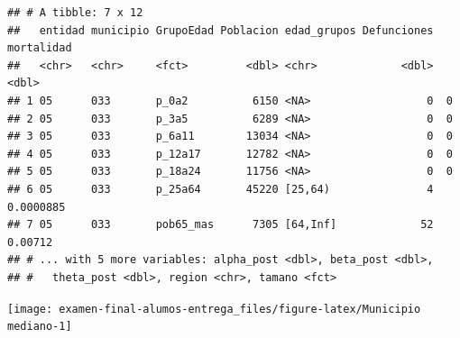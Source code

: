 \documentclass[
]{article}
\newenvironment{Shaded}{\begin{snugshade}}{\end{snugshade}}
\newcommand{\DataTypeTok}[1]{\textcolor[rgb]{0.13,0.29,0.53}{#1}}
\newcommand{\KeywordTok}[1]{\textcolor[rgb]{0.13,0.29,0.53}{\textbf{#1}}}
\newcommand{\NormalTok}[1]{#1}
\newcommand{\OperatorTok}[1]{\textcolor[rgb]{0.81,0.36,0.00}{\textbf{#1}}}
\newcommand{\StringTok}[1]{\textcolor[rgb]{0.31,0.60,0.02}{#1}}
\begin{document}
\begin{verbatim}
## # A tibble: 7 x 12
##   entidad municipio GrupoEdad Poblacion edad_grupos Defunciones mortalidad
##   <chr>   <chr>     <fct>         <dbl> <chr>             <dbl>      <dbl>
## 1 05      033       p_0a2          6150 <NA>                  0  0        
## 2 05      033       p_3a5          6289 <NA>                  0  0        
## 3 05      033       p_6a11        13034 <NA>                  0  0        
## 4 05      033       p_12a17       12782 <NA>                  0  0        
## 5 05      033       p_18a24       11756 <NA>                  0  0        
## 6 05      033       p_25a64       45220 [25,64)               4  0.0000885
## 7 05      033       pob65_mas      7305 [64,Inf]             52  0.00712  
## # ... with 5 more variables: alpha_post <dbl>, beta_post <dbl>,
## #   theta_post <dbl>, region <chr>, tamano <fct>
\end{verbatim}

\begin{Shaded}
\end{Shaded}

\begin{center}\texttt{[image: examen-final-alumos-entrega\_files/figure-latex/Municipio mediano-1]} \end{center}

\begin{Shaded}
\end{Shaded}
\end{document}
